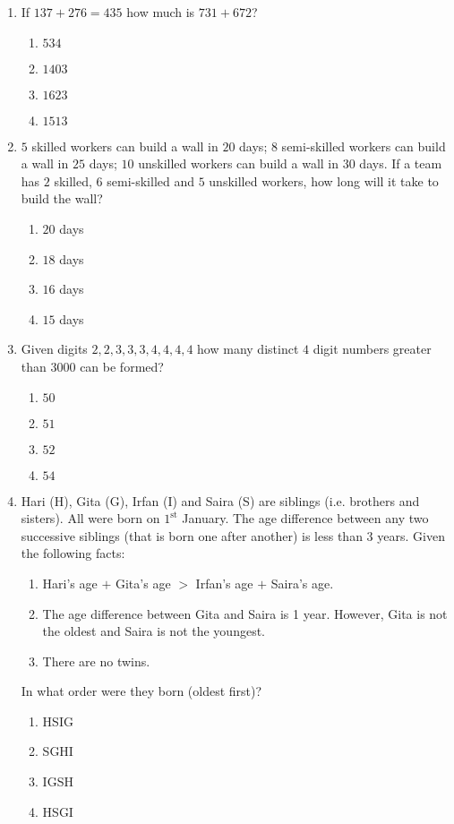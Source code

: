 \documentclass[journal]{IEEEtran}
\begin{document}
\begin{enumerate}
    \item If $137 + 276 = 435$ how much is $731 + 672$?
    \begin{enumerate}
        \item $534$
        \item $1403$
        \item $1623$
        \item $1513$
    \end{enumerate}

    \item $5$ skilled workers can build a wall in $20$ days; $8$ semi-skilled workers can build a wall in $25$ days; $10$ unskilled workers can build a wall in $30$ days. If a team has $2$ skilled, $6$ semi-skilled and $5$ unskilled workers, how long will it take to build the wall?
    \begin{enumerate}
        \item $20$ days
        \item $18$ days
        \item $16$ days
        \item $15$ days
    \end{enumerate}

    \item Given digits $2, 2, 3, 3, 3, 4, 4, 4, 4$ how many distinct $4$ digit numbers greater than $3000$ can be formed?
    \begin{enumerate}
        \item $50$
        \item $51$
        \item $52$
        \item $54$
    \end{enumerate}

    \item \label{65} Hari (H), Gita (G), Irfan (I) and Saira (S) are siblings (i.e. brothers and sisters). All were born on $1^{\text{st}}$ January. The age difference between any two successive siblings (that is born one after another) is less than $3$ years. Given the following facts:
    \begin{enumerate}
        \item Hari's age $+$ Gita's age $>$ Irfan's age $+$ Saira's age.
        \item The age difference between Gita and Saira is 1 year. However, Gita is not the oldest and Saira is not the youngest.
        \item There are no twins.
    \end{enumerate}
    In what order were they born (oldest first)?
    \begin{enumerate}
        \item HSIG
        \item SGHI
        \item IGSH
        \item HSGI
    \end{enumerate}
\end{enumerate}


  
\end{document}
